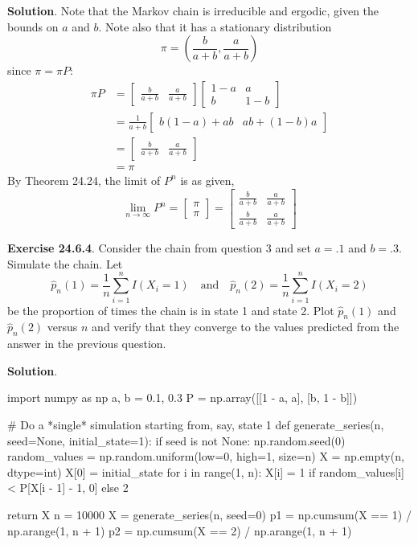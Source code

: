 \textbf{Solution}. Note that the Markov chain is irreducible and
ergodic, given the bounds on \(a\) and \(b\). Note also that it has a
stationary distribution
\[
\pi = \left( \frac{b}{a + b}, \frac{a}{a + b} \right)
\]
since \(\pi = \pi P\):
\begin{align*}
\pi P &= 
\begin{bmatrix} 
\frac{b}{a + b} & \frac{a}{a + b}
\end{bmatrix} \begin{bmatrix}
1 - a & a \\
b & 1 - b
\end{bmatrix} \\
&= \frac{1}{a + b} \begin{bmatrix}
 b (1 - a) + ab &
 ab + (1 - b) a 
\end{bmatrix} \\
&= \begin{bmatrix} \frac{b}{a + b} & \frac{a}{a + b} \end{bmatrix}\\
&= \pi
\end{align*}
By Theorem 24.24, the limit of \(P^{n}\) is as given,
\[
\lim_{n \rightarrow \infty} P^{n} = 
\begin{bmatrix}
\pi \\ \pi
\end{bmatrix}
=
\begin{bmatrix}
\frac{b}{a + b} & \frac{a}{a + b} \\
\frac{b}{a + b} & \frac{a}{a + b}
\end{bmatrix}
\]

\textbf{Exercise 24.6.4}. Consider the chain from question 3 and set
\(a = .1\) and \(b = .3\). Simulate the chain. Let
\[
\hat{p}_{n}(1) = \frac{1}{n} \sum_{i=1}^{n} I(X_{i} = 1)
\quad \text{and} \quad
\hat{p}_{n}(2) = \frac{1}{n} \sum_{i=1}^{n} I(X_{i} = 2)
\]
be the proportion of times the chain is in state 1 and state 2. Plot
\(\hat{p}_{n}(1)\) and \(\hat{p}_{n}(2)\) versus \(n\) and verify that they
converge to the values predicted from the answer in the previous
question.

\textbf{Solution}.

\begin{python}
import numpy as np
a, b = 0.1, 0.3
P = np.array([[1 - a, a], [b, 1 - b]])
\end{python}

\begin{python}
# Do a *single* simulation starting from, say, state 1
def generate_series(n, seed=None, initial_state=1):
    if seed is not None:
        np.random.seed(0)
    random_values = np.random.uniform(low=0, high=1, size=n)
    X = np.empty(n, dtype=int)
    X[0] = initial_state
    for i in range(1, n):
        X[i] = 1 if random_values[i] < P[X[i - 1] - 1, 0] else 2
        
    return X
n = 10000
X = generate_series(n, seed=0)
p1 = np.cumsum(X == 1) / np.arange(1, n + 1)
p2 = np.cumsum(X == 2) / np.arange(1, n + 1)
\end{python}

